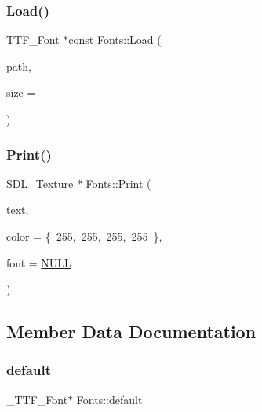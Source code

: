 \mbox{\label{class_fonts_aa8f815fd37417b05870d1719c42c249f}} 
\subsubsection{\texorpdfstring{Load()}{Load()}}
{\footnotesize\ttfamily T\+T\+F\+\_\+\+Font $\ast$const Fonts\+::\+Load (\begin{DoxyParamCaption}\item[{const char $\ast$}]{path,  }\item[{int}]{size = {} }\end{DoxyParamCaption})}

\mbox{\label{class_fonts_ad027839894083559beb914ec51c6c5ac}} 
\subsubsection{\texorpdfstring{Print()}{Print()}}
{\footnotesize\ttfamily S\+D\+L\+\_\+\+Texture $\ast$ Fonts\+::\+Print (\begin{DoxyParamCaption}\item[{const char $\ast$}]{text,  }\item[{S\+D\+L\+\_\+\+Color}]{color = {\ttfamily \{~255,~255,~255,~255~\}},  }\item[{\+\_\+\+T\+T\+F\+\_\+\+Font $\ast$}]{font = {\ttfamily \mbox{\hyperlink{_defs_8h_a070d2ce7b6bb7e5c05602aa8c308d0c4}{N\+U\+LL}}} }\end{DoxyParamCaption})}



\subsection{Member Data Documentation}
\mbox{\label{class_fonts_a8bc38464637e59ffe0e57b8f7c8c39ca}} 
\subsubsection{\texorpdfstring{default}{default}}
{\footnotesize\ttfamily \+\_\+\+T\+T\+F\+\_\+\+Font$\ast$ Fonts\+::default}

\mbox{\label{class_fonts_a6384a64519f8c48889c8c1e00ca502d5}} 
